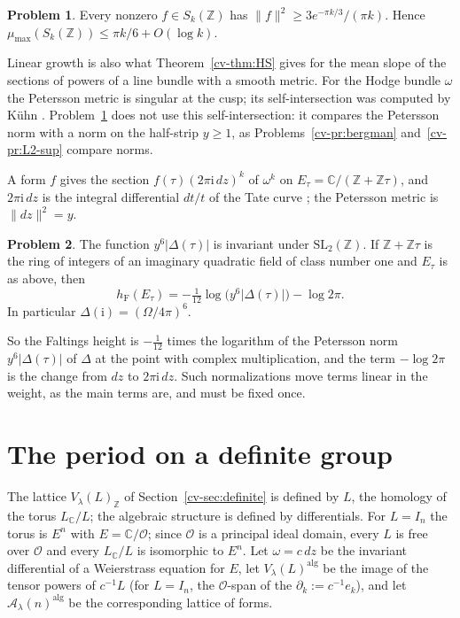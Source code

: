 \documentclass[reqno]{amsart}
\theoremstyle{definition}
\newtheorem{problem}{Problem}[section]
\theoremstyle{plain}
\newcommand{\Z}{\mathbb{Z}}
\newcommand{\C}{\mathbb{C}}
\newcommand{\Oc}{\mathcal{O}}
\newcommand{\Ac}{\mathcal{A}}
\newcommand{\ii}{\mathrm{i}}
\newcommand{\mumax}{\mu_{\max}}
\newcommand{\hF}{h_{\mathrm{F}}}
\begin{document}
\begin{problem}\label{pr:Sk-lambda}
Every nonzero \(f \in S_k(\Z)\) has \(\lVert f \rVert^2 \ge 3e^{-\pi k/3}/(\pi k)\).  Hence \(\mumax(S_k(\Z)) \le \pi k/6 + O(\log k)\).
\end{problem}

Linear growth is also what Theorem~\ref{cv-thm:HS} gives for the mean slope of the sections of powers of a line bundle with a smooth metric.  For the Hodge bundle \(\omega\) the Petersson metric is singular at the cusp; its self-intersection was computed by K\"uhn \cite{Ku01}.  Problem~\ref{pr:Sk-lambda} does not use this self-intersection: it compares the Petersson norm with a norm on the half-strip \(y \ge 1\), as Problems~\ref{cv-pr:bergman} and~\ref{cv-pr:L2-sup} compare norms.

A form \(f\) gives the section \(f(\tau)(2\pi\ii\,dz)^k\) of \(\omega^k\) on \(E_\tau = \C/(\Z + \Z\tau)\), and \(2\pi\ii\,dz\) is the integral differential \(dt/t\) of the Tate curve \cite{Ka73}; the Petersson metric is \(\lVert dz \rVert^2 = y\).

\begin{problem}\label{pr:pet-cm}
The function \(y^6\lvert\Delta(\tau)\rvert\) is invariant under \(\mathrm{SL}_2(\Z)\).  If \(\Z + \Z\tau\) is the ring of integers of an imaginary quadratic field of class number one and \(E_\tau\) is as above, then
\[
  \hF(E_\tau) = -\tfrac{1}{12}\log\bigl(y^6\lvert\Delta(\tau)\rvert\bigr) - \log 2\pi .
\]
In particular \(\Delta(\ii) = (\Omega/4\pi)^6\).
\end{problem}

So the Faltings height is \(-\tfrac1{12}\) times the logarithm of the Petersson norm \(y^6\lvert\Delta(\tau)\rvert\) of \(\Delta\) at the point with complex multiplication, and the term \(-\log 2\pi\) is the change from \(dz\) to \(2\pi\ii\,dz\).  Such normalizations move terms linear in the weight, as the main terms are, and must be fixed once.

\section{The period on a definite group}\label{sec:definite-period}

The lattice \(V_\lambda(L)_\Z\) of Section~\ref{cv-sec:definite} is defined by \(L\), the homology of the torus \(L_\C/L\); the algebraic structure is defined by differentials.  For \(L = I_n\) the torus is \(E^n\) with \(E = \C/\Oc\); since \(\Oc\) is a principal ideal domain, every \(L\) is free over \(\Oc\) and every \(L_\C/L\) is isomorphic to \(E^n\).  Let \(\omega = c\,dz\) be the invariant differential of a Weierstrass equation for \(E\), let \(V_\lambda(L)^{\mathrm{alg}}\) be the image of the tensor powers of \(c^{-1}L\) (for \(L = I_n\), the \(\Oc\)-span of the \(\partial_k := c^{-1}e_k\)), and let \(\Ac_\lambda(n)^{\mathrm{alg}}\) be the corresponding lattice of forms.
\end{document}
